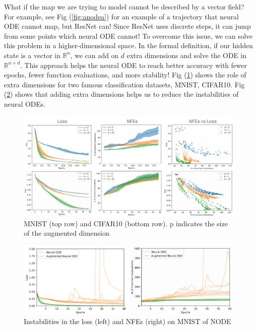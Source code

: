 \documentclass{article}
\newcommand\pef[1]{(\ref{#1})}
\begin{document}
	What if the map we are trying to model cannot be described by a vector field? \cite{dupont2019augmented}  For example, see Fig \pef{fig:anodea} for an example of a trajectory that neural ODE cannot map, but ResNet can! Since ResNet uses discrete steps, it can jump from some points which neural ODE cannot! To overcome this issue, we can solve this problem in a higher-dimensional space. In the formal definition, if our hidden state is a vector in \(\mathbb{R}^n\), we can add on \(d\) extra dimensions and solve the ODE in \(\mathbb{R}^{n+d}\).  This approach helps the neural ODE to reach better accuracy with fewer epochs, fewer function evaluations, and more stability! Fig \pef{fig:anode1} shows the role of extra dimensions for two famous classification datasets, MNIST, CIFAR10. Fig \pef{fig:anode2} shows that adding extra dimensions helps us to reduce the instabilities of neural ODEs.
	
	\begin{figure}
		\includegraphics[width=1\linewidth]{images/anode-1}
		\caption{MNIST (top row) and CIFAR10 (bottom row). p indicates the size of the augmented dimension}
		\label{fig:anode1}
	\end{figure}
	
	\begin{figure}
		\includegraphics[width=1\linewidth]{images/anode-2}
		\caption{Instabilities in the loss (left) and NFEs (right) on MNIST of NODE}
		\label{fig:anode2}
	\end{figure}
\end{document}
